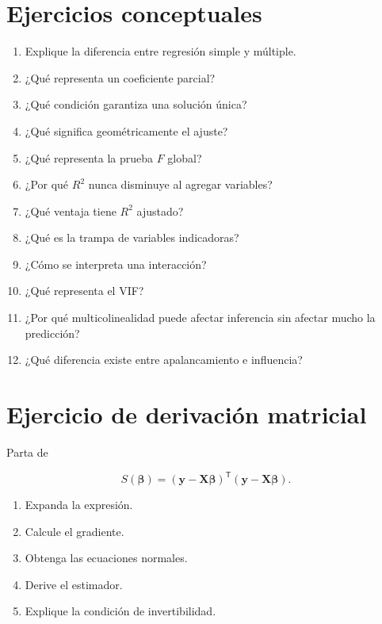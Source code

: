\documentclass[
  spanish,
  11pt,
  letterpaper,
  DIV=11,
  numbers=noendperiod]{scrreprt}
\providecommand{\tightlist}{%
  \setlength{\itemsep}{0pt}\setlength{\parskip}{0pt}}
\theoremstyle{definition}
\theoremstyle{plain}
\theoremstyle{definition}
\theoremstyle{remark}
\begin{document}
\section{Ejercicios conceptuales}\label{ejercicios-conceptuales-9}

\begin{enumerate}
\def\labelenumi{\arabic{enumi}.}
\tightlist
\item
  Explique la diferencia entre regresión simple y múltiple.
\item
  ¿Qué representa un coeficiente parcial?
\item
  ¿Qué condición garantiza una solución única?
\item
  ¿Qué significa geométricamente el ajuste?
\item
  ¿Qué representa la prueba \(F\) global?
\item
  ¿Por qué \(R^2\) nunca disminuye al agregar variables?
\item
  ¿Qué ventaja tiene \(R^2\) ajustado?
\item
  ¿Qué es la trampa de variables indicadoras?
\item
  ¿Cómo se interpreta una interacción?
\item
  ¿Qué representa el VIF?
\item
  ¿Por qué multicolinealidad puede afectar inferencia sin afectar mucho
  la predicción?
\item
  ¿Qué diferencia existe entre apalancamiento e influencia?
\end{enumerate}

\section{Ejercicio de derivación
matricial}\label{ejercicio-de-derivaciuxf3n-matricial}

Parta de

\[
S(\boldsymbol{\beta})
=
(\mathbf{y}-\mathbf{X}\boldsymbol{\beta})^{\mathsf T}
(\mathbf{y}-\mathbf{X}\boldsymbol{\beta}).
\]

\begin{enumerate}
\def\labelenumi{\arabic{enumi}.}
\tightlist
\item
  Expanda la expresión.
\item
  Calcule el gradiente.
\item
  Obtenga las ecuaciones normales.
\item
  Derive el estimador.
\item
  Explique la condición de invertibilidad.
\end{enumerate}
\end{document}
